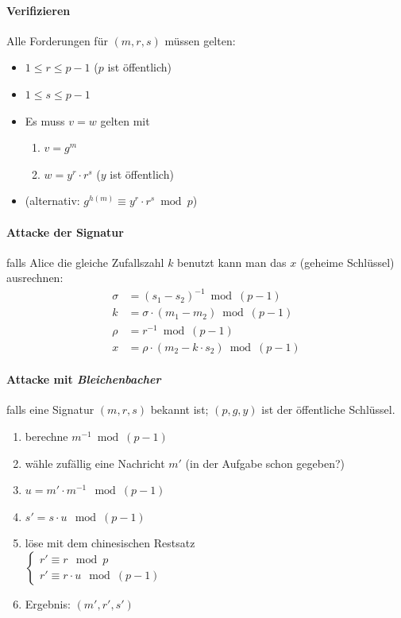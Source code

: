 \documentclass[8pt,a4paper,landscape]{article}
\begin{document}
\begin{multicols}{4}
\paragraph{Verifizieren} Alle Forderungen für $(m, r, s)$ müssen gelten:
\begin{itemize}[itemsep=1pt] 
    \item $1 \leq r \leq p-1$  ($p$ ist öffentlich)
    \item $1 \leq s \leq p-1$ 
    \item Es muss $v=w$ gelten mit \begin{enumerate}[itemsep=1pt] 
    \item $v = g^m$
    \item $w = y^{r} \cdot r^{s}$ ($y$ ist öffentlich)
    \end{enumerate}
    \item (alternativ: $g^{h(m)} \equiv y^{r} \cdot r^{s} \bmod p$)
\end{itemize}

\paragraph{Attacke der Signatur} falls Alice die gleiche Zufallszahl $k$ benutzt 
kann man das $x$ (geheime Schlüssel) ausrechnen:
\begin{align*}
\sigma &= (s_{1} - s_{2})^{-1} \bmod (p-1)\\
 k      &= \sigma \cdot (m_{1} - m_{2}) \bmod (p-1)\\
 \rho   &= r^{-1} \bmod (p-1)\\
 x      &= \rho \cdot (m_{2} - k \cdot s_{2}) \bmod (p-1)
\end{align*}

\paragraph{Attacke mit \emph{Bleichenbacher}} falls eine Signatur $(m,r,s)$
bekannt ist; $(p,g,y)$ ist der öffentliche Schlüssel.
\begin{enumerate}
\item berechne $m^{-1} \bmod (p-1)$
\item wähle zufällig eine Nachricht $m'$ (in der Aufgabe schon gegeben?)
\item $u  = m' \cdot m^{-1} \mod (p-1)$
\item $s' = s \cdot u \mod (p-1)$
\item löse mit dem chinesischen Restsatz \\[0.3cm]
      $
		\begin{cases}
            r' \equiv r \mod p \\
            r' \equiv r \cdot u \mod (p-1)
        \end{cases}      
      $
\item Ergebnis: $(m', r', s')$
\end{enumerate}


\end{multicols}
\end{document}
